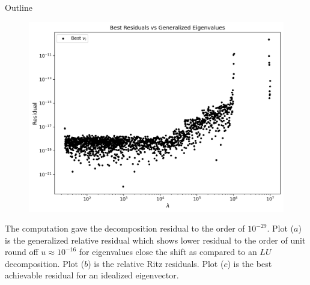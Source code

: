 \documentclass[landscape]{beamer}
\begin{document}
\begin{frame}[allowframebreaks]{Outline}
\begin{figure}
	\vspace{2ex}  %
	
	\centering
	\includegraphics[scale=.25]{./Plots/eigdecomp/residual_eig_bs.png}
	\subcaption{}
\end{figure}
	
	The computation gave the decomposition residual to the order of $10^{-29}$. Plot ($a$) is the generalized relative residual which shows lower residual to the order of unit round off $u \approx10^{-16}$ for eigenvalues close the shift as compared to an $LU$ decomposition. Plot ($b$) is the relative Ritz residuals. Plot ($c$) is the best achievable residual for an idealized eigenvector.
\end{frame}
\end{document}
